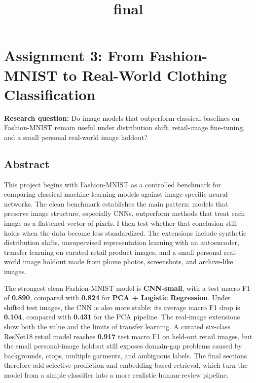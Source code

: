 \documentclass[11pt]{article}
\title{final}
\begin{document}
    
    \maketitle
    
    

    
    \section{Assignment 3: From Fashion-MNIST to Real-World Clothing
Classification}\label{assignment-3-from-fashion-mnist-to-real-world-clothing-classification}

\textbf{Research question:} Do image models that outperform classical
baselines on Fashion-MNIST remain useful under distribution shift,
retail-image fine-tuning, and a small personal real-world image holdout?

\subsection{Abstract}\label{abstract}

This project begins with Fashion-MNIST as a controlled benchmark for
comparing classical machine-learning models against image-specific
neural networks. The clean benchmark establishes the main pattern:
models that preserve image structure, especially CNNs, outperform
methods that treat each image as a flattened vector of pixels. I then
test whether that conclusion still holds when the data become less
standardized. The extensions include synthetic distribution shifts,
unsupervised representation learning with an autoencoder, transfer
learning on curated retail product images, and a small personal
real-world image holdout made from phone photos, screenshots, and
archive-like images.

The strongest clean Fashion-MNIST model is \textbf{CNN-small}, with a
test macro F1 of \textbf{0.890}, compared with \textbf{0.824} for
\textbf{PCA + Logistic Regression}. Under shifted test images, the CNN
is also more stable: its average macro F1 drop is \textbf{0.104},
compared with \textbf{0.431} for the PCA pipeline. The real-image
extensions show both the value and the limits of transfer learning. A
curated six-class ResNet18 retail model reaches \textbf{0.917} test
macro F1 on held-out retail images, but the small personal-image holdout
still exposes domain-gap problems caused by backgrounds, crops, multiple
garments, and ambiguous labels. The final sections therefore add
selective prediction and embedding-based retrieval, which turn the model
from a simple classifier into a more realistic human-review pipeline.
\end{document}
